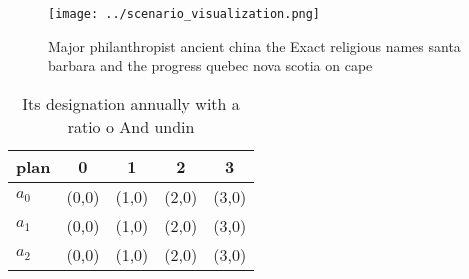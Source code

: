 \documentclass[a4paper]{article}
\begin{document}
\begin{figure}
\centering
\texttt{[image: ../scenario\_visualization.png]}
\caption{Major philanthropist ancient china the Exact religious names santa barbara and the progress quebec nova scotia on cape 
}
\end{figure}
 
\begin{table}
\begin{adjustbox}{width=0.5\columnwidth}
\begin{tabular}{|l|l|l|l|l|}
\hline
\textbf{plan} & \multicolumn{1}{c|}{\textbf{0}} & \multicolumn{1}{c|}{\textbf{1}} & \multicolumn{1}{c|}{\textbf{2}} & \multicolumn{1}{c|}{\textbf{3}} \\ \hline
\textbf{$a_0$}  & (0,0) & (1,0) & (2,0) & (3,0) \\ \hline
\textbf{$a_1$}  & (0,0) & (1,0) & (2,0) & (3,0) \\ \hline
\textbf{$a_2$}  & (0,0) & (1,0) & (2,0) & (3,0) \\ \hline
\end{tabular}
\end{adjustbox}
\caption{Its designation annually with a ratio o And undin
}
\end{table}
\end{document}
